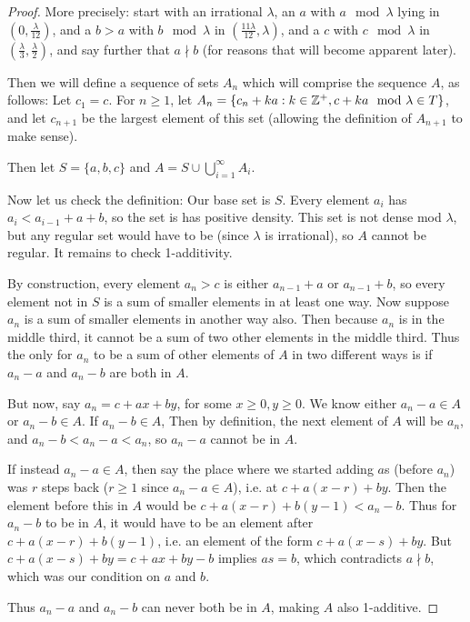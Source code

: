 \documentclass{article}
\theoremstyle{definition}
\theoremstyle{remark}
\numberwithin{equation}{section}
\begin{document}
\begin{proof}
  More precisely: start with an irrational $\lambda$, an $a$ with
  $a \mod{\lambda}$ lying in $(0, \frac{\lambda}{12})$, and a $b > a$
  with $b \mod{\lambda}$ in $(\frac{11\lambda}{12},\lambda)$, and a
  $c$ with $c \mod{\lambda}$ in $(\frac\lambda 3, \frac\lambda 2)$,
  and say further that $a \nmid b$ (for reasons that will become
  apparent later).

  Then we will define a sequence of sets $A_n$ which will comprise the
  sequence $A$, as follows: Let $c_1 = c$.  For $n \geq 1$, let
  $A_n = \{c_n + ka : k \in \mathbb{Z}^+, c+ka\mod{\lambda} \in T\}$, and let
  $c_{n+1}$ be the largest element of this set (allowing the
  definition of $A_{n+1}$ to make sense).  

  Then let $S = \{a, b, c\}$ and $A = S \cup \bigcup_{i=1}^\infty
  A_i$.  

  Now let us check the definition: Our base set is $S$.  Every element
  $a_i$ has $a_i < a_{i-1} + a + b$, so the set is has positive
  density.  This set is not dense mod $\lambda$, but any regular set
  would have to be (since $\lambda$ is irrational), so $A$ cannot be
  regular.  It remains to check 1-additivity.  

  By construction, every element $a_n > c$ is either $a_{n-1} + a$ or
  $a_{n-1}+b$, so every element not in $S$ is a sum of smaller
  elements in at least one way.  Now suppose $a_n$ is a sum of smaller
  elements in another way also.  Then because $a_n$ is in the middle
  third, it cannot be a sum of two other elements in the middle third.
  Thus the only for $a_n$ to be a sum of other elements of $A$ in two
  different ways is if $a_n - a$ and $a_n - b$ are both in $A$.  

  But now, say $a_n = c + ax + by$, for some $x \geq 0, y \geq 0$.
  We know either $a_n - a \in A$ or $a_n - b \in A$.  If $a_n - b \in
  A$, Then by definition, the next element of $A$ will be $a_n$, and
  $a_n - b < a_n - a < a_n$, so $a_n - a$ cannot be in $A$.  

  If instead $a_n - a \in A$, then say the place where we started
  adding $a$s (before $a_n$) was $r$ steps back ($r \geq 1$ since
  $a_n - a \in A$), i.e. at $c + a(x-r) + by$.  Then the element
  before this in $A$ would be $c + a(x-r) + b(y-1) < a_n - b$.  Thus
  for $a_n - b$ to be in $A$, it would have to be an element after
  $c + a(x-r) + b(y-1)$, i.e. an element of the form
  $c + a(x-s) + by$.  But $c + a(x-s) + by = c + ax + by - b$ implies
  $as = b$, which contradicts $a \nmid b$, which was our condition on
  $a$ and $b$.  

  Thus $a_n - a$ and $a_n - b$ can never both be in $A$, making $A$
  also 1-additive.
\end{proof}
\end{document}
